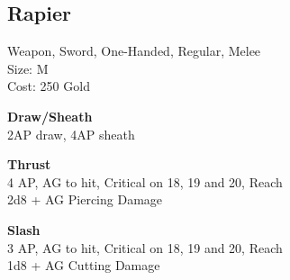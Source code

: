 \subsection{Rapier}\label{weapon:rapier}
Weapon, Sword, One-Handed, Regular, Melee\\
Size: M\\
Cost: 250 Gold

\textbf{Draw/Sheath}\\
2AP draw, 4AP sheath

\textbf{Thrust}\\
4 AP, AG to hit, Critical on 18, 19 and 20,  Reach\\
2d8 + \texttimes AG Piercing Damage

\textbf{Slash}\\
3 AP, AG to hit, Critical on 18, 19 and 20,  Reach\\
1d8 + \texttimes AG Cutting Damage